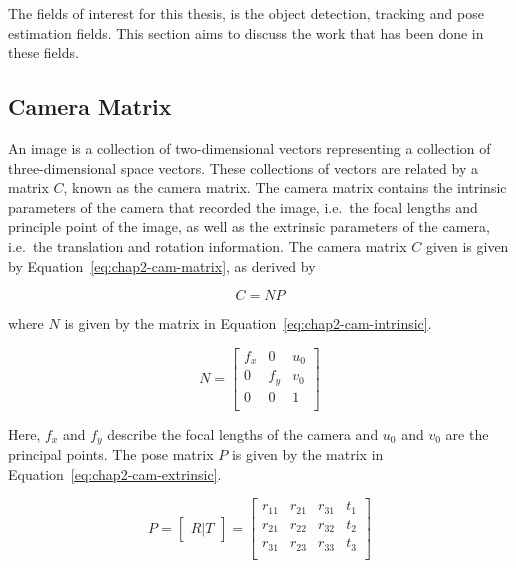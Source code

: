 The fields of interest for this thesis, is the object detection, tracking and pose estimation fields. This section aims to discuss the work that has been done in these fields. 

\subsection{Camera Matrix}

An image is a collection of two-dimensional vectors representing a collection of three-dimensional space vectors. These collections of vectors are related by a matrix $C$, known as the camera matrix. The camera matrix contains the intrinsic parameters of the camera that recorded the image, i.e.\ the focal lengths and principle point of the image, as well as the extrinsic parameters of the camera, i.e.\ the translation and rotation information. The camera matrix $C$ given is given by Equation~\ref{eq:chap2-cam-matrix}, as derived by~\cite{heikkila1997four}

\begin{equation}
  \label{eq:chap2-cam-matrix}
  C = 
  NP
\end{equation}

where $N$ is given by the matrix in Equation~\ref{eq:chap2-cam-intrinsic}.

\begin{equation}
  \label{eq:chap2-cam-intrinsic}
  N = 
  \begin{bmatrix}
    f_x & 0   & u_0 \\
    0   & f_y & v_0 \\
    0   & 0   & 1   \\
  \end{bmatrix}
\end{equation}

Here, $f_x$ and $f_y$ describe the focal lengths of the camera and $u_0$ and $v_0$ are the principal points. The pose matrix $P$ is given by the matrix in Equation~\ref{eq:chap2-cam-extrinsic}.

\begin{equation}
  \label{eq:chap2-cam-extrinsic}
  P = 
  \begin{bmatrix}
    R | T
  \end{bmatrix}
  =
  \begin{bmatrix}
    r_{11} & r_{21} & r_{31} & t_1 \\
    r_{21} & r_{22} & r_{32} & t_2 \\
    r_{31} & r_{23} & r_{33} & t_3 \\
  \end{bmatrix}
\end{equation}


